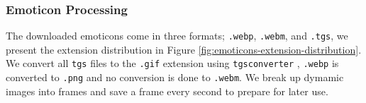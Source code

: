 
\subsubsection{Emoticon Processing}
The downloaded emoticons come in three formats; \texttt{.webp}, \texttt{.webm}, and \texttt{.tgs}, we present the extension distribution in Figure \ref{fig:emoticons-extension-distribution}. We convert all \texttt{tgs} files to the \texttt{.gif} extension using \texttt{tgsconverter} \cite{tgsconverter}, \texttt{.webp} is converted to \texttt{.png} and no conversion is done to \texttt{.webm}. We break up dymamic images into frames and save a frame every second to prepare for later use.


